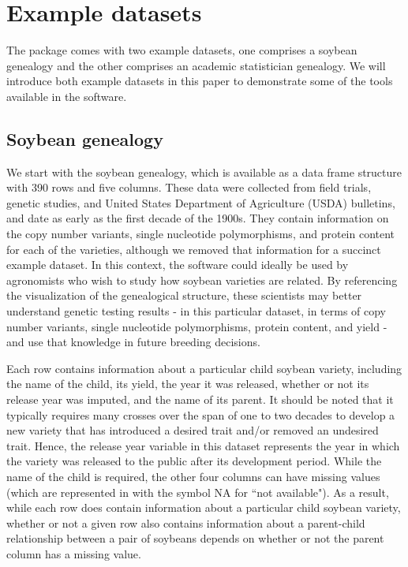 \documentclass[article,shortnames]{jss}
\begin{document}
\section{Example datasets}
\label{exData}

The  package comes with two example datasets, one comprises a soybean genealogy and the other comprises an academic statistician genealogy. We will introduce both example datasets in this paper to demonstrate some of the tools available in the software.

\subsection{Soybean genealogy}

We start with the soybean genealogy, which is available as a data frame structure with 390 rows and five columns. These data were collected from field trials, genetic studies, and United States Department of Agriculture (USDA) bulletins, and date as early as the first decade of the 1900s. They contain information on the copy number variants, single nucleotide polymorphisms, and protein content for each of the varieties, although we removed that information for a succinct example dataset. In this context, the software could ideally be used by agronomists who wish to study how soybean varieties are related. By referencing the visualization of the genealogical structure, these scientists may better understand genetic testing results - in this particular dataset, in terms of copy number variants, single nucleotide polymorphisms, protein content, and yield - and use that knowledge in future breeding decisions.

Each row contains information about a particular child soybean variety, including the name of the child, its yield, the year it was released, whether or not its release year was imputed, and the name of its parent. It should be noted that it typically requires many crosses over the span of one to two decades to develop a new variety that has introduced a desired trait and/or removed an undesired trait. Hence, the release year variable in this dataset represents the year in which the variety was released to the public after its development period. While the name of the child is required, the other four columns can have missing values (which are represented in  with the symbol NA for ``not available"). As a result, while each row does contain information about a particular child soybean variety, whether or not a given row also contains information about a parent-child relationship between a pair of soybeans depends on whether or not the parent column has a missing value.
\end{document}
